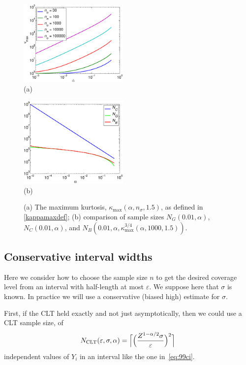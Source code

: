 \documentclass{article}
\begin{document}
\begin{figure}
\centering
\begin{minipage}{2.1in}
\centering \includegraphics[width=2.1in]{kurtmaxfig} \\
(a)
\end{minipage}
\quad 
\begin{minipage}{2.1in}\centering
\includegraphics[width=2.1in]{alphacompare}\\
(b)
\end{minipage}
\caption{(a) The maximum kurtosis, $\kappa_{\max}(\alpha,n_{\sigma},1.5)$, as defined in \eqref{kappamaxdef}; (b) comparison of sample sizes $ N_G(0.01,\alpha)$, $N_C(0.01,\alpha)$, and $N_B(0.01,\alpha,\kappa_{\max}^{3/4}(\alpha,1000,1.5))$.\label{kurtmaxcompareNfig}}
\end{figure}

\subsection{Conservative interval widths}

Here we consider how to choose the sample size
$n$ to get the desired coverage level
from an interval with half-length at most $\varepsilon$.
We suppose here that $\sigma$ is known.  
In practice we will use a conservative (biased high) estimate
for $\sigma$.

First, if the CLT held exactly and not just asymptotically,
then we could use a CLT sample size, of
$$
N_{\mathrm{CLT}}(\varepsilon,\sigma,\alpha)
= 
\Bigl\lceil
\Bigl(
\frac{Z^{1-\alpha/2}\sigma}{\varepsilon}
\Bigr)^2
\Bigr\rceil
$$
independent values of $Y_i$ in an interval
like the one in~\eqref{eq:99ci}.
\end{document}

